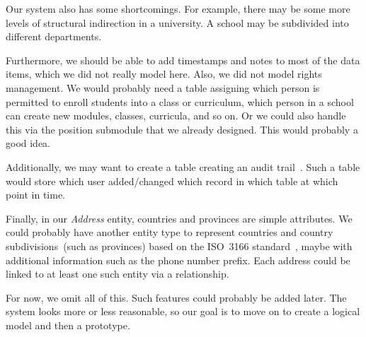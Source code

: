 Our system also has some shortcomings.
For example, there may be some more levels of structural indirection in a university.
A school may be subdivided into different departments.

Furthermore, we should be able to add timestamps and notes to most of the data items, which we did not really model here.
Also, we did not model rights management.
We would probably need a table assigning which person is permitted to enroll students into a class or curriculum, which person in a school can create new modules, classes, curricula, and so on.
Or we could also handle this via the position submodule that we already designed.
This would probably a good idea.

Additionally, we may want to create a table creating an audit trail~\cite{K2010ATTDCID}.
Such a table would store which user added/changed which record in which table at which point in time.

Finally, in our \emph{Address} entity, countries and provinces are simple attributes.
We could probably have another entity type to represent countries and country subdivisions~(such as provinces) based on the ISO~3166 standard~\cite{ISO3166}, maybe with additional information such as the phone number prefix.
Each address could be linked to at least one such entity via a relationship.

For now, we omit all of this.
Such features could probably be added later.
The system looks more or less reasonable, so our goal is to move on to create a logical model and then a prototype.%
%
\FloatBarrier%
\endhsection%
%

